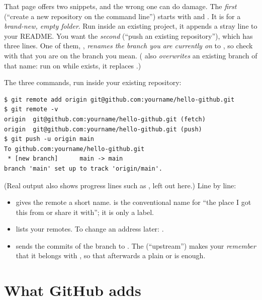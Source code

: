 \begin{pitfall}
That page offers two snippets, and the wrong one can do damage. The \emph{first} (``create a new repository on the command line'') starts with  and . It is for a \emph{brand-new, empty folder}. Run inside an existing project, it appends a stray line to your README. You want the \emph{second} (``push an existing repository''), which has three lines. One of them, , \emph{renames the branch you are currently on} to , so check with  that you are on the branch you mean. ( also \emph{overwrites} an existing branch of that name: run on  while  exists, it replaces .)
\end{pitfall}

The three commands, run inside your existing repository:

\begin{lstlisting}
$ git remote add origin git@github.com:yourname/hello-github.git
$ git remote -v
origin  git@github.com:yourname/hello-github.git (fetch)
origin  git@github.com:yourname/hello-github.git (push)
$ git push -u origin main
To github.com:yourname/hello-github.git
 * [new branch]      main -> main
branch 'main' set up to track 'origin/main'.
\end{lstlisting}

(Real output also shows progress lines such as , left out here.) Line by line:
\begin{itemize}
  \item {} gives the remote a short name.  is the conventional name for ``the place I got this from or share it with''; it is only a label.
  \item {} lists your remotes. To change an address later: .
  \item {} sends the commits of the branch  to . The  (``upstream'') makes your  \emph{remember} that it belongs with , so that afterwards a plain  or  is enough.
\end{itemize}

\section{What GitHub adds}

